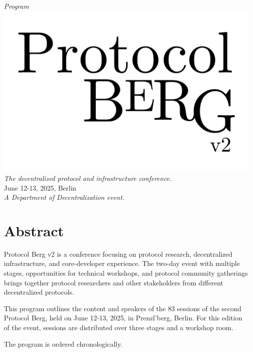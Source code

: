 \begin{titlepage}
  \begin{center}
    \textit{\huge Program}\\[1em]
    \includegraphics[width=\textwidth]{protocol.pdf}\\[1em]
    \textit{The decentralized protocol and infrastructure conference.}\\
    {June 12-13, 2025, Berlin}\\[1em]
    \vspace{\fill}
    \textit{\small A Department of Decentralization event.}
  \end{center}
\end{titlepage}

\pagestyle{fancy}

\cleardoublepage

\section*{Abstract}
Protocol Berg v2 is a conference focusing on protocol research, decentralized
infrastructure, and core-developer experience. The two-day event with multiple
stages, opportunities for technical workshops, and protocol community gatherings
brings together protocol researchers and other stakeholders from different
decentralized protocols.

This program outlines the content and speakers of the 83 sessions of the second
Protocol Berg, held on June 12-13, 2025, in Prenzl'berg, Berlin. For this
edition of the event, sessions are distributed over three stages and a workshop
room.

The program is ordered chronologically.

\cleardoublepage

\tableofcontents

\cleardoublepage
